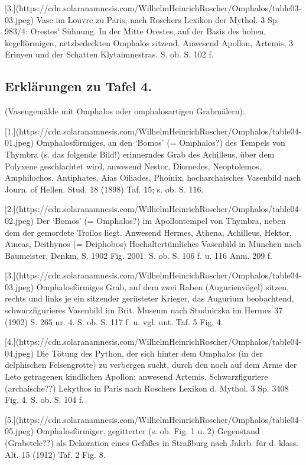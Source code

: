 \documentclass[a4paper, 11pt, oneside]{article}
\begin{document}
[3.](https://cdn.solaranamnesis.com/WilhelmHeinrichRoscher/Omphalos/table03-03.jpeg) Vase im Louvre zu Paris, nach Roschers Lexikon der Mythol. 3 Sp. 983/4: Orestes' Sühnung. In der Mitte Orestes, auf der Basis des hohen, kegelförmigen, netzbedeckten Omphalos sitzend. Anwesend Apollon, Artemis, 3 Erinyen und der Schatten Klytaimnestras. S. ob. S. 102 f.
\clearpage
\subsection{Erklärungen zu Tafel 4.}

(Vasengemälde mit Omphalos oder omphalosartigen Grabmälern).

[1.](https://cdn.solaranamnesis.com/WilhelmHeinrichRoscher/Omphalos/table04-01.jpeg) Omphalosförmiges, an den `Bomos' (= Omphalos?) des Tempels von Thymbra (s. das folgende Bild!) erinnerndes Grab des Achilleus, über dem Polyxene geschlachtet wird, anwesend Nestor, Diomedes, Neoptolemos, Amphilochos, Antiphates, Aias Oiliades, Phoinix, hocharchaisches Vasenbild nach Journ. of Hellen. Stud. 18 (1898) Taf. 15; s. ob. S. 116.

[2.](https://cdn.solaranamnesis.com/WilhelmHeinrichRoscher/Omphalos/table04-02.jpeg) Der `Bomos' (= Omphalos?) im Apollontempel von Thymbra, neben dem der gemordete Troilos liegt. Anwesend Hermes, Athena, Achilleus, Hektor, Aineas, Deithynos (= Deiphobos)  Hochaltertümliches Vasenbild in München nach Baumeister, Denkm, S. 1902 Fig. 2001. S. ob. S. 106 f. u. 116 Anm. 209 f.

[3.](https://cdn.solaranamnesis.com/WilhelmHeinrichRoscher/Omphalos/table04-03.jpeg) Omphalosförmiges Grab, auf dem zwei Raben (Augurienvögel) sitzen, rechts und links je ein sitzender gerüsteter Krieger, das Augurium beobachtend, schwarzfigurieres Vasenbild im Brit. Museum nach Studniczka im Hermes 37 (1902) S. 265 nr. 4. S. ob. S. 117 f. u. vgl. unt. Taf. 5 Fig. 4.

[4.](https://cdn.solaranamnesis.com/WilhelmHeinrichRoscher/Omphalos/table04-04.jpeg) Die Tötung des Python, der sich hinter dem Omphalos (in der delphischen Felsengrotte) zu verbergen sucht, durch den noch auf dem Arme der Leto getragenen kindlichen Apollon; anwesend Artemis. Schwarzfiguriere (archaische??) Lekythos in Paris nach Roschers Lexikon d. Mythol. 3 Sp. 3408 Fig. 4. S. ob. S. 104 f.

[5.](https://cdn.solaranamnesis.com/WilhelmHeinrichRoscher/Omphalos/table04-05.jpeg) Omphalosförmiger, gegitterter (s. ob. Fig. 1 u. 2) Gegenstand (Grabstele??) als Dekoration eines Gefäßes in Straßburg nach Jahrb. für d. klass. Alt. 15 (1912) Taf. 2 Fig. 8.
\end{document}
